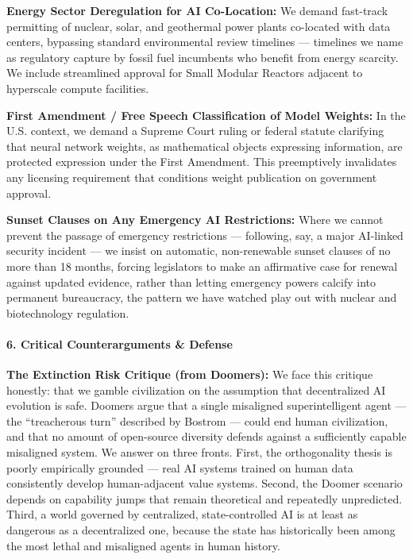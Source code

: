 \textbf{Energy Sector Deregulation for AI Co-Location:} We demand
fast-track permitting of nuclear, solar, and geothermal power plants
co-located with data centers, bypassing standard environmental review
timelines --- timelines we name as regulatory capture by fossil fuel
incumbents who benefit from energy scarcity. We include streamlined
approval for Small Modular Reactors adjacent to hyperscale compute
facilities.

\textbf{First Amendment / Free Speech Classification of Model Weights:}
In the U.S. context, we demand a Supreme Court ruling or federal statute
clarifying that neural network weights, as mathematical objects
expressing information, are protected expression under the First
Amendment. This preemptively invalidates any licensing requirement that
conditions weight publication on government approval.

\textbf{Sunset Clauses on Any Emergency AI Restrictions:} Where we
cannot prevent the passage of emergency restrictions --- following, say,
a major AI-linked security incident --- we insist on automatic,
non-renewable sunset clauses of no more than 18 months, forcing
legislators to make an affirmative case for renewal against updated
evidence, rather than letting emergency powers calcify into permanent
bureaucracy, the pattern we have watched play out with nuclear and
biotechnology regulation.

\paragraph{6. Critical Counterarguments \&
Defense}\label{critical-counterarguments-defense-11}

\textbf{The Extinction Risk Critique (from Doomers):} We face this
critique honestly: that we gamble civilization on the assumption that
decentralized AI evolution is safe. Doomers argue that a single
misaligned superintelligent agent --- the ``treacherous turn'' described
by Bostrom --- could end human civilization, and that no amount of
open-source diversity defends against a sufficiently capable misaligned
system. We answer on three fronts. First, the orthogonality thesis is
poorly empirically grounded --- real AI systems trained on human data
consistently develop human-adjacent value systems. Second, the Doomer
scenario depends on capability jumps that remain theoretical and
repeatedly unpredicted. Third, a world governed by centralized,
state-controlled AI is at least as dangerous as a decentralized one,
because the state has historically been among the most lethal and
misaligned agents in human history.

